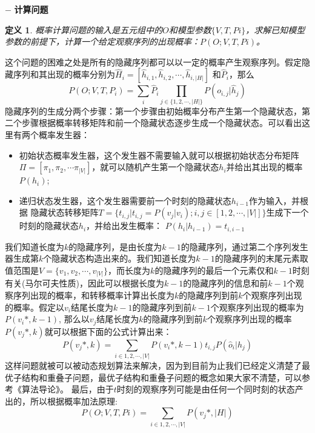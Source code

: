 \documentclass[twoside,a4paper,12pt]{book}%
\newtheorem{definition}{定义}
\begin{document}
$-$  \textbf{计算问题}
\begin{definition}
概率计算问题的输入是五元组中的$O$和模型参数$\{V,T,Pi\}$，求解已知模型参数的前提下，计算一个给定观察序列的出现概率：$P(O;V,T,Pi)$。
\end{definition}


这个问题的困难之处是所有的隐藏序列都可以以一定的概率产生观察序列。假定隐藏序列和其出现的概率分别为$\hat{H}_i=[\hat{h}_{i,1},\hat{h}_{i,2},\cdots,\hat{h}_{i,|H|}]$ 和$\hat{P}_i$，那么
$$
P(O;V,T,P_i)=\sum_{i}{\hat{P}_i\prod_{j\in\{1,2,\cdots,|H|\}}{P(o_{i,j}|\hat{h}_j)}}
$$
隐藏序列的生成分两个步骤：第一个步骤由初始概率分布产生第一个隐藏状态，第二个步骤根据概率转移矩阵和前一个隐藏状态逐步生成一个隐藏状态。可以看出这里有两个概率发生器：
\begin{itemize}
 \item 初始状态概率发生器，这个发生器不需要输入就可以根据初始状态分布矩阵$\Pi=[\pi_1,\pi_2,\cdots \pi_{|V|}]$，就可以随机产生第一个隐藏状态$h_i$并给出其出现的概率$P(h_i)$;
 \item 递归状态发生器，这个发生器需要前一个时刻的隐藏状态$h_{i-1}$作为输入，并根据 隐藏状态转移矩阵$T=\{t_{i,j}|t_{i,j}=P(v_j|v_i); i,j \in [1,2,\cdots,|V|]\}$生成下一个时刻的隐藏状态$h_{i}$，并给出发生概率：
 $
 P(h_i|h_{i-1}) = t_{i,i-1}
 $
\end{itemize}
我们知道长度为$k$的隐藏序列，是由长度为$k-1$的隐藏序列，通过第二个序列发生器生成第$k$个隐藏状态构造出来的。我们知道长度为$k-1$的隐藏序列的末尾元素取值范围是$V=\{v_1,v_2,\cdots,v_{|V|}\}$，而长度为$k$的隐藏序列的最后一个元素仅和$k-1$时刻有关(马尔可夫性质)，因此可以根据长度为$k-1$的隐藏序列的信息和前$k-1$个观察序列出现的概率，和转移概率计算出长度为$k$的隐藏序列到前$k$个观察序列出现的概率。假定以$v_i$结尾长度为$k-1$的隐藏序列到前$k-1$个观察序列出现的概率为$P(v_i*,k-1)$, 那么以$v_j$结尾长度为$k$的隐藏序列到前$k$个观察序列出现的概率$P(v_j*,k)$就可以根据下面的公式计算出来：
$$
P(v_j*,k)=\sum_{i\in{1,2,\cdots,|V|}}{P(v_i*,k-1)t_{i,j}P(\hat{o}_i|h_j)}
$$
这样问题就被可以被动态规划算法来解决，因为到目前为止我们已经定义清楚了最优子结构和重叠子问题，最优子结构和重叠子问题的概念如果大家不清楚，可以参考《算法导论》。
最后，由于$t$时刻的观察序列可能是由任何一个同时刻的状态产出的，所以根据概率加法原理:
$$P(O;V,T,Pi)=\sum_{i\in{1,2,\cdots,|V|}}P(v_j*,|H|)$$
\end{document}
